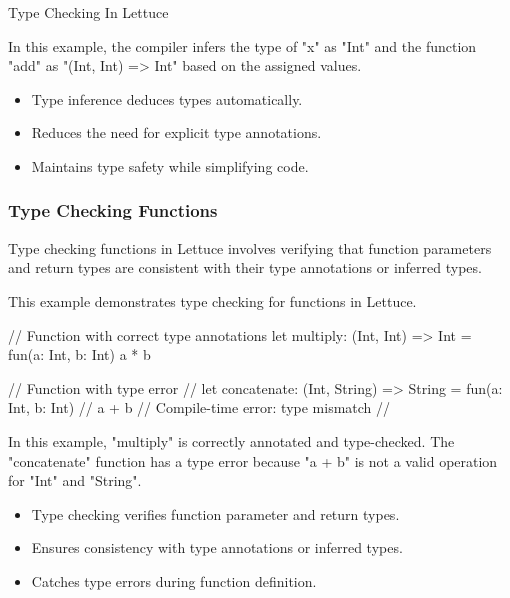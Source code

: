 \begin{notes}{Type Checking In Lettuce}
\begin{highlight}
        In this example, the compiler infers the type of "x" as "Int" and the function "add" as "(Int, Int) => Int" based on the assigned values.
    
        \begin{itemize}
            \item Type inference deduces types automatically.
            \item Reduces the need for explicit type annotations.
            \item Maintains type safety while simplifying code.
        \end{itemize}
    
    \end{highlight}
    
    \subsubsection*{Type Checking Functions}
    
    Type checking functions in Lettuce involves verifying that function parameters and return types are consistent with their type annotations or inferred types.
    
    \begin{highlight}
    
        This example demonstrates type checking for functions in Lettuce.
    
    \begin{code}[Lettuce]
    // Function with correct type annotations
    let multiply: (Int, Int) => Int = fun(a: Int, b: Int) {
        a * b
    }
    
    // Function with type error
    // let concatenate: (Int, String) => String = fun(a: Int, b: Int) {
    //     a + b  // Compile-time error: type mismatch
    // }
    \end{code}
    
        In this example, "multiply" is correctly annotated and type-checked. The "concatenate" function has a type error because "a + b" is not a valid operation for "Int" and "String".
    
        \begin{itemize}
            \item Type checking verifies function parameter and return types.
            \item Ensures consistency with type annotations or inferred types.
            \item Catches type errors during function definition.
        \end{itemize}
    

\end{highlight}
\end{notes}
